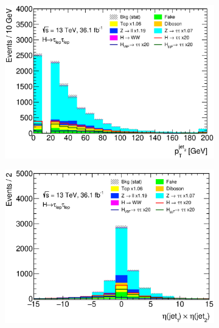 \begin{figure}[htb]
    \centering
    \begin{subfigure}[t]{0.45\textwidth}
        \includegraphics[width=\textwidth]{./plots/event_selection/categories/ll-CutbVeto-JetPt1-lin.eps}
        \caption{}\label{fig:event_selection:cutflow:vbf:jet2}
    \end{subfigure}
    \begin{subfigure}[t]{0.45\textwidth}
        \includegraphics[width=\textwidth]{./plots/event_selection/categories/ll-CutVBFCatJet1Pt-EtaProductJ0J1-lin.eps}
        \caption{}\label{fig:event_selection:cutflow:vbf:hemispheres}
    \end{subfigure}
    \begin{subfigure}[t]{0.45\textwidth}

\end{subfigure}
\end{figure}
